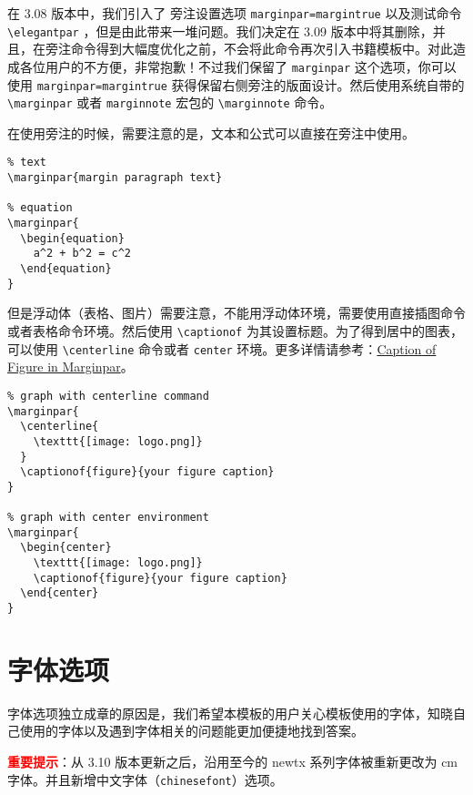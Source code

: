 \documentclass[lang=cn,newtx,10pt,scheme=chinese,color=black]{elegantbook}
\begin{document}
在 3.08 版本中，我们引入了 旁注设置选项 \lstinline{marginpar=margintrue} 以及测试命令 \lstinline{\elegantpar} ，但是由此带来一堆问题。我们决定在 3.09 版本中将其删除，并且，在旁注命令得到大幅度优化之前，不会将此命令再次引入书籍模板中。对此造成各位用户的不方便，非常抱歉！不过我们保留了 \lstinline{marginpar} 这个选项，你可以使用 \lstinline{marginpar=margintrue} 获得保留右侧旁注的版面设计。然后使用系统自带的 \lstinline{\marginpar} 或者 \lstinline{marginnote} 宏包的 \lstinline{\marginnote} 命令。

\begin{remark}
在使用旁注的时候，需要注意的是，文本和公式可以直接在旁注中使用。

\begin{lstlisting}
% text
\marginpar{margin paragraph text}

% equation
\marginpar{
  \begin{equation}
    a^2 + b^2 = c^2
  \end{equation}
}
\end{lstlisting}

但是浮动体（表格、图片）需要注意，不能用浮动体环境，需要使用直接插图命令或者表格命令环境。然后使用 \lstinline{\captionof} 为其设置标题。为了得到居中的图表，可以使用 \lstinline{\centerline} 命令或者 \lstinline{center} 环境。更多详情请参考：\href{https://tex.stackexchange.com/questions/5583/caption-of-figure-in-marginpar-and-caption-of-wrapfigure-in-margin}{Caption of Figure in Marginpar}。

\begin{lstlisting}
% graph with centerline command
\marginpar{
  \centerline{
    \texttt{[image: logo.png]}
  }
  \captionof{figure}{your figure caption}
}

% graph with center environment
\marginpar{
  \begin{center}
    \texttt{[image: logo.png]}
    \captionof{figure}{your figure caption}
  \end{center}
}
\end{lstlisting}

\end{remark}

\chapter{字体选项}
字体选项独立成章的原因是，我们希望本模板的用户关心模板使用的字体，知晓自己使用的字体以及遇到字体相关的问题能更加便捷地找到答案。

\textcolor{red}{\bfseries 重要提示}：从 3.10 版本更新之后，沿用至今的 newtx 系列字体被重新更改为 cm 字体。并且新增中文字体（\lstinline{chinesefont}）选项。
\end{document}
